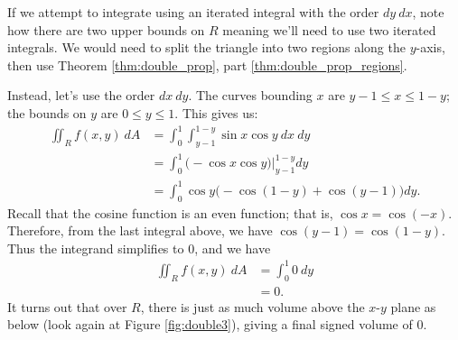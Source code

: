 {If we attempt to integrate using an iterated integral with the order $dy\ dx$, note how there are two upper bounds on $R$ meaning we'll need to use two iterated integrals. We would need to split the triangle into two regions along the $y$-axis, then use Theorem \ref{thm:double_prop}, part \ref{thm:double_prop_regions}.

Instead, let's use the order $dx\ dy$. The curves bounding $x$ are $y-1\leq x\leq 1-y$; the bounds on $y$ are $0\leq y\leq 1$. This gives us:
\begin{align*}
\iint_R f(x,y)\ dA &= \int_0^1\int_{y-1}^{1-y}\sin x\cos y\ dx\ dy\\
		&= \int_0^1\left.\Big( -\cos x\cos y\Big)\right|_{y-1}^{1-y}dy\\
		&= \int_0^1 \cos y\Big(-\cos (1-y) + \cos(y-1)\Big)dy.
\end{align*}
Recall that the cosine function is an even function; that is, $\cos x = \cos (-x)$. Therefore, from the last integral above, we have $\cos (y-1) = \cos (1-y)$. Thus the integrand simplifies to 0, and we have 
\begin{align*}
\iint_R f(x,y)\ dA &= \int_0^1 0\ dy \\
&= 0.
\end{align*}
It turns out that over $R$, there is just as much volume above the $x$-$y$ plane as below (look again at Figure \ref{fig:double3}), giving a final signed volume of 0. 
}\\

